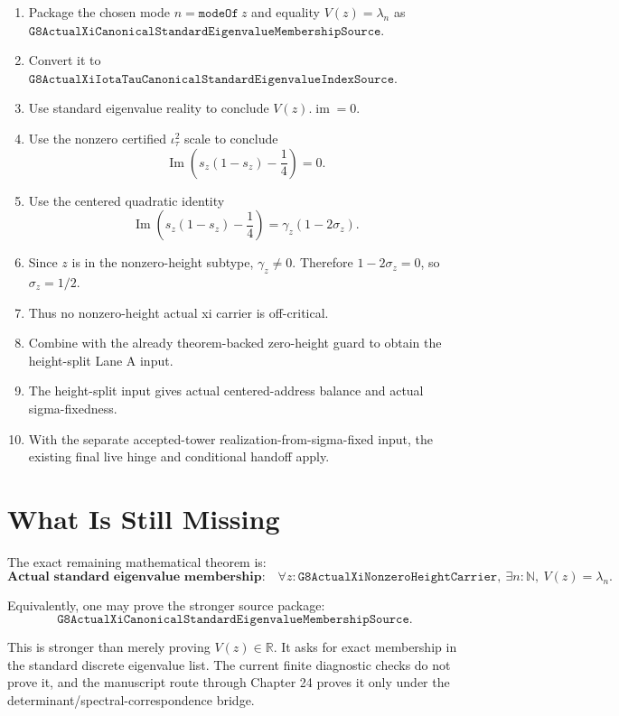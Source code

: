 \documentclass[11pt]{article}
\begin{document}
\begin{enumerate}
\item Package the chosen mode \(n=\texttt{modeOf}\ z\) and equality
  \(V(z)=\lambda_n\) as
  \(\texttt{G8ActualXiCanonicalStandardEigenvalueMembershipSource}\).
\item Convert it to
  \(\texttt{G8ActualXiIotaTauCanonicalStandardEigenvalueIndexSource}\).
\item Use standard eigenvalue reality to conclude \(V(z).\operatorname{im}=0\).
\item Use the nonzero certified \(\iota_\tau^2\) scale to conclude
  \[
    \operatorname{Im}\left(s_z(1-s_z)-\frac14\right)=0.
  \]
\item Use the centered quadratic identity
  \[
    \operatorname{Im}\left(s_z(1-s_z)-\frac14\right)
    =
    \gamma_z(1-2\sigma_z).
  \]
\item Since \(z\) is in the nonzero-height subtype, \(\gamma_z\ne0\).
  Therefore \(1-2\sigma_z=0\), so \(\sigma_z=1/2\).
\item Thus no nonzero-height actual xi carrier is off-critical.
\item Combine with the already theorem-backed zero-height guard to obtain the
  height-split Lane A input.
\item The height-split input gives actual centered-address balance and actual
  sigma-fixedness.
\item With the separate accepted-tower realization-from-sigma-fixed input,
  the existing final live hinge and conditional handoff apply.
\end{enumerate}

\section*{What Is Still Missing}

The exact remaining mathematical theorem is:
\[
  \textbf{Actual standard eigenvalue membership:}\quad
  \forall z : \texttt{G8ActualXiNonzeroHeightCarrier},\
  \exists n : \mathbb{N},\
  V(z)=\lambda_n.
\]

Equivalently, one may prove the stronger source package:
\[
  \texttt{G8ActualXiCanonicalStandardEigenvalueMembershipSource}.
\]

This is stronger than merely proving \(V(z)\in\mathbb{R}\).  It asks for exact
membership in the standard discrete eigenvalue list.  The current finite
diagnostic checks do not prove it, and the manuscript route through Chapter 24
proves it only under the determinant/spectral-correspondence bridge.
\end{document}
